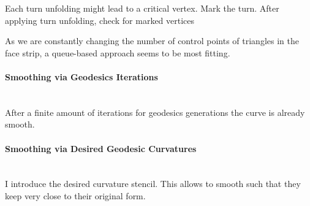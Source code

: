\documentclass{stdlocal}
\begin{document}
  Each turn unfolding might lead to a critical vertex.
  Mark the turn.
  After applying turn unfolding, check for marked vertices

  As we are constantly changing the number of control points of triangles in the face strip, a queue-based approach seems to be most fitting.

  \paragraph{Smoothing via Geodesics Iterations}\hfill\\
  After a finite amount of iterations for geodesics generations the curve is already smooth.

  \paragraph{Smoothing via Desired Geodesic Curvatures}\hfill\\
  I introduce the desired curvature stencil.
  This allows to smooth such that they keep very close to their original form.





\end{document}
